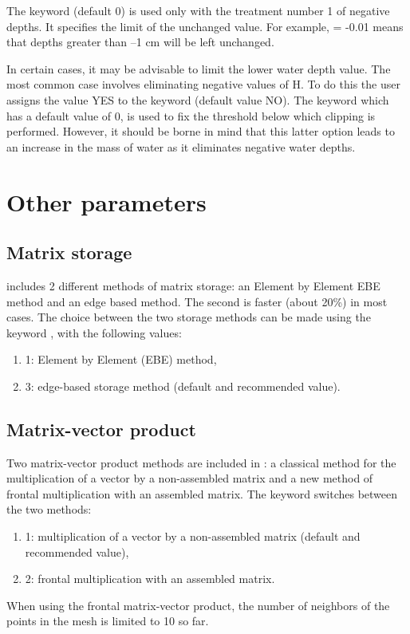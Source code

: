  The keyword  (default 0) is used only with the treatment number 1 of negative depths. It specifies the limit of the unchanged value. For example,  = -0.01 means that depths greater than --1 cm will be left unchanged.

 In certain cases, it may be advisable to limit the lower water depth value. The most common case involves eliminating negative values of H. To do this the user assigns the value YES to the keyword  (default value NO). The keyword  which has a default value of 0, is used to fix the threshold below which clipping is performed. However, it should be borne in mind that this latter option leads to an increase in the mass of water as it eliminates negative water depths.

\section{ Other parameters}

\subsection{ Matrix storage}

  includes 2 different methods of matrix storage: an Element by Element EBE method and an edge based method. The second is faster (about 20\%) in most cases. The choice between the two storage methods can be made using the keyword , with the following values:

\begin{enumerate}
\item [\nonumber]  1: Element by Element (EBE) method,

\item [\nonumber] 3: edge-based storage method (default and recommended value).
\end{enumerate}


\subsection{ Matrix-vector product}

 Two matrix-vector product methods are included in : a classical method for the multiplication of a vector by a non-assembled matrix and a new method of frontal multiplication with an assembled matrix. The keyword   switches between the two methods:

\begin{enumerate}
\item[\nonumber]  1: multiplication of a vector by a non-assembled matrix (default and recommended value),

\item[\nonumber]  2: frontal multiplication with an assembled matrix.
\end{enumerate}

 When using the frontal matrix-vector product, the number of neighbors of the points in the mesh is limited to 10 so far.

